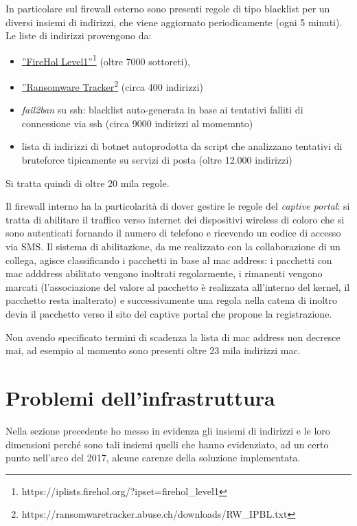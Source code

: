 In particolare sul firewall esterno sono presenti regole di tipo blacklist per
un diversi insiemi di indirizzi, che viene aggiornato
periodicamente (ogni 5 minuti).  Le liste di indirizzi provengono da:

\begin{itemize}
    \item \href{https://iplists.firehol.org/?ipset=firehol\_level1}{''FireHol
	Level1''}\footnote{https://iplists.firehol.org/?ipset=firehol\_level1} (oltre
	7000 sottoreti),
    \item \href{https://ransomwaretracker.abuse.ch/downloads/RW\_IPBL.txt}{''Ransomware
	Tracker}\footnote{https://ransomwaretracker.abuse.ch/downloads/RW\_IPBL.txt}
	(circa 400 indirizzi)
    \item {\em fail2ban} su ssh: blacklist auto-generata in base ai tentativi
	falliti di connessione via ssh (circa 9000 indirizzi al momemnto)
    \item lista di indirizzi di botnet autoprodotta da script che analizzano
	tentativi di bruteforce tipicamente su servizi di posta (oltre 12.000
	indirizzi)
\end{itemize}
 
Si tratta quindi di oltre 20 mila regole.

Il firewall interno ha la particolarità di dover gestire le regole del {\em
captive portal}: si tratta di abilitare il traffico verso internet dei
dispositivi wireless di coloro che si sono autenticati fornando il numero di
telefono e ricevendo un codice di accesso via SMS.  Il sistema di
abilitazione, da me realizzato con la collaborazione di un collega, agisce
classificando i pacchetti in base al mac address: i pacchetti con mac adddress
abilitato vengono inoltrati regolarmente, i rimanenti vengono marcati
(l'associazione del valore al pacchetto è realizzata all'interno del kernel,
il pacchetto resta inalterato) e successivamente una regola nella catena di
inoltro devia il pacchetto verso il sito del captive portal che propone la
registrazione.

Non avendo specificato termini di scadenza la lista di mac address non
decresce mai, ad esempio al momento sono presenti oltre 23 mila indirizzi mac.

\section{Problemi dell'infrastruttura}

Nella sezione precedente ho messo in evidenza gli insiemi di indirizzi e le
loro dimensioni perché sono tali insiemi quelli che hanno evidenziato, ad un
certo punto nell'arco del 2017, alcune carenze della soluzione implementata.

